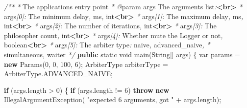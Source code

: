 \documentclass[11pt]{article}
\newenvironment{Shaded}{}{}
\newcommand{\KeywordTok}[1]{\textcolor[rgb]{0.00,0.44,0.13}{\textbf{{#1}}}}
\newcommand{\DataTypeTok}[1]{\textcolor[rgb]{0.56,0.13,0.00}{{#1}}}
\newcommand{\DecValTok}[1]{\textcolor[rgb]{0.25,0.63,0.44}{{#1}}}
\newcommand{\StringTok}[1]{\textcolor[rgb]{0.25,0.44,0.63}{{#1}}}
\newcommand{\CommentTok}[1]{\textcolor[rgb]{0.38,0.63,0.69}{\textit{{#1}}}}
\newcommand{\FunctionTok}[1]{\textcolor[rgb]{0.02,0.16,0.49}{{#1}}}
\newcommand{\NormalTok}[1]{{#1}}
\newcommand{\ControlFlowTok}[1]{\textcolor[rgb]{0.00,0.44,0.13}{\textbf{{#1}}}}
\newcommand{\OperatorTok}[1]{\textcolor[rgb]{0.40,0.40,0.40}{{#1}}}
\newcommand{\BuiltInTok}[1]{{#1}}
\begin{document}
\begin{Shaded}
\begin{Highlighting}[]
    \CommentTok{/**}
     \CommentTok{*}\NormalTok{ The application}\CommentTok{\textquotesingle{}}\NormalTok{s entry point}
\CommentTok{     * @}\NormalTok{param args The arguments list}\CommentTok{:}\KeywordTok{\textless{}br\textgreater{}}
     \CommentTok{*}\NormalTok{             args}\CommentTok{[0]:}\NormalTok{ The minimum delay}\CommentTok{,}\NormalTok{ ms}\CommentTok{,} \CommentTok{\textasciigrave{}}\NormalTok{int}\CommentTok{\textasciigrave{}}\KeywordTok{\textless{}br\textgreater{}}
     \CommentTok{*}\NormalTok{             args}\CommentTok{[1]:}\NormalTok{ The maximum delay}\CommentTok{,}\NormalTok{ ms}\CommentTok{,} \CommentTok{\textasciigrave{}}\NormalTok{int}\CommentTok{\textasciigrave{}}\KeywordTok{\textless{}br\textgreater{}}
     \CommentTok{*}\NormalTok{             args}\CommentTok{[2]:}\NormalTok{ The number of iterations}\CommentTok{,} \CommentTok{\textasciigrave{}}\NormalTok{int}\CommentTok{\textasciigrave{}}\KeywordTok{\textless{}br\textgreater{}}
     \CommentTok{*}\NormalTok{             args}\CommentTok{[3]:}\NormalTok{ The philosopher count}\CommentTok{,} \CommentTok{\textasciigrave{}}\NormalTok{int}\CommentTok{\textasciigrave{}}\KeywordTok{\textless{}br\textgreater{}}
     \CommentTok{*}\NormalTok{             args}\CommentTok{[4]:}\NormalTok{ Whether mute the Logger or not}\CommentTok{,} \CommentTok{\textasciigrave{}}\NormalTok{boolean}\CommentTok{\textasciigrave{}}\KeywordTok{\textless{}br\textgreater{}}
     \CommentTok{*}\NormalTok{             args}\CommentTok{[5]:}\NormalTok{ The arbiter type}\CommentTok{:} \CommentTok{\textquotesingle{}}\NormalTok{naive}\CommentTok{\textquotesingle{},} \CommentTok{\textquotesingle{}}\NormalTok{advanced\_naive}\CommentTok{\textquotesingle{},}
     \CommentTok{*}                      \CommentTok{\textquotesingle{}}\NormalTok{simultaneous}\CommentTok{\textquotesingle{},} \CommentTok{\textquotesingle{}}\NormalTok{waiter}\CommentTok{\textquotesingle{}}
     \CommentTok{*/}
    \KeywordTok{public} \DataTypeTok{static} \DataTypeTok{void} \FunctionTok{main}\OperatorTok{(}\BuiltInTok{String}\OperatorTok{[]}\NormalTok{ args}\OperatorTok{)} \OperatorTok{\{}
        \DataTypeTok{var}\NormalTok{ params }\OperatorTok{=} \KeywordTok{new} \FunctionTok{Params}\OperatorTok{(}\DecValTok{0}\OperatorTok{,} \DecValTok{0}\OperatorTok{,} \DecValTok{100}\OperatorTok{,} \DecValTok{6}\OperatorTok{);}
\NormalTok{        ArbiterType arbiterType }\OperatorTok{=}\NormalTok{ ArbiterType}\OperatorTok{.}\FunctionTok{ADVANCED\_NAIVE}\OperatorTok{;}

        \ControlFlowTok{if} \OperatorTok{(}\NormalTok{args}\OperatorTok{.}\FunctionTok{length} \OperatorTok{\textgreater{}} \DecValTok{0}\OperatorTok{)} \OperatorTok{\{}
            \ControlFlowTok{if} \OperatorTok{(}\NormalTok{args}\OperatorTok{.}\FunctionTok{length} \OperatorTok{!=} \DecValTok{6}\OperatorTok{)}
                \ControlFlowTok{throw} \KeywordTok{new} \BuiltInTok{IllegalArgumentException}\OperatorTok{(}
                    \StringTok{"expected 6 arguments, got "} \OperatorTok{+}\NormalTok{ args}\OperatorTok{.}\FunctionTok{length}\OperatorTok{);}


\end{Highlighting}
\end{Shaded}
\end{document}
